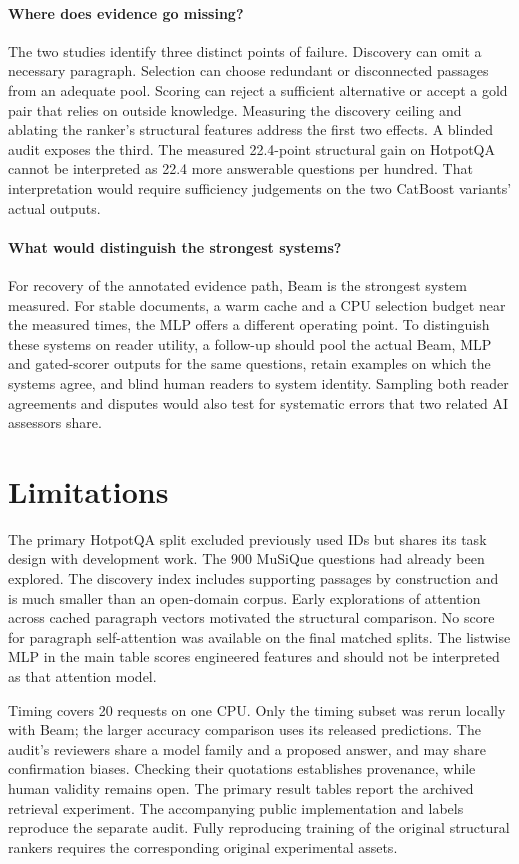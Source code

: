 \documentclass[twoside,a4paper,11pt]{article}
\begin{document}
\paragraph{Where does evidence go missing?}
The two studies identify three distinct points of failure. Discovery can omit a necessary paragraph. Selection can choose redundant or disconnected passages from an adequate pool. Scoring can reject a sufficient alternative or accept a gold pair that relies on outside knowledge. Measuring the discovery ceiling and ablating the ranker's structural features address the first two effects. A blinded audit exposes the third. The measured 22.4-point structural gain on HotpotQA cannot be interpreted as 22.4 more answerable questions per hundred. That interpretation would require sufficiency judgements on the two CatBoost variants' actual outputs.

\paragraph{What would distinguish the strongest systems?}
For recovery of the annotated evidence path, Beam is the strongest system measured. For stable documents, a warm cache and a CPU selection budget near the measured times, the MLP offers a different operating point. To distinguish these systems on reader utility, a follow-up should pool the actual Beam, MLP and gated-scorer outputs for the same questions, retain examples on which the systems agree, and blind human readers to system identity. Sampling both reader agreements and disputes would also test for systematic errors that two related AI assessors share.

\section{Limitations}
The primary HotpotQA split excluded previously used IDs but shares its task design with development work. The 900 MuSiQue questions had already been explored. The discovery index includes supporting passages by construction and is much smaller than an open-domain corpus. Early explorations of attention across cached paragraph vectors motivated the structural comparison. No score for paragraph self-attention was available on the final matched splits. The listwise MLP in the main table scores engineered features and should not be interpreted as that attention model.

Timing covers 20 requests on one CPU. Only the timing subset was rerun locally with Beam; the larger accuracy comparison uses its released predictions. The audit's reviewers share a model family and a proposed answer, and may share confirmation biases. Checking their quotations establishes provenance, while human validity remains open. The primary result tables report the archived retrieval experiment. The accompanying public implementation and labels reproduce the separate audit. Fully reproducing training of the original structural rankers requires the corresponding original experimental assets.
\end{document}
